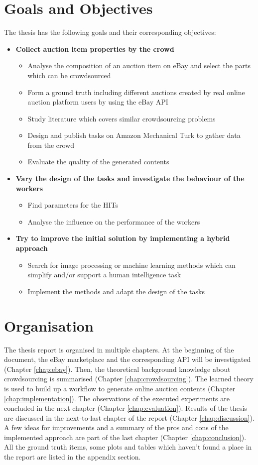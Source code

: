 \documentclass[a4paper]{report}
\begin{document}
\section{Goals and Objectives}
The thesis has the following goals and their corresponding objectives:
\begin{itemize}
	\item \textbf{Collect auction item properties by the crowd}
	\begin{itemize}
		\item Analyse the composition of an auction item on eBay and select the parts which can be crowdsourced
		\item Form a ground truth including different auctions created by real online auction platform users by using the eBay API
		\item Study literature which covers similar crowdsourcing problems
		\item Design and publish tasks on Amazon Mechanical Turk to gather data from the crowd
		\item Evaluate the quality of the generated contents
	\end{itemize}
	\item \textbf{Vary the design of the tasks and investigate the behaviour of the workers}
	\begin{itemize}
		\item Find parameters for the HITs
		\item Analyse the influence on the performance of the workers
	\end{itemize}
	\item \textbf{Try to improve the initial solution by implementing a hybrid approach}
	\begin{itemize}
		\item Search for image processing or machine learning methods which can simplify and/or support a human intelligence task
		\item Implement the methods and adapt the design of the tasks
	\end{itemize}
\end{itemize}

\section{Organisation}
The thesis report is organised in multiple chapters. At the beginning of the document, the eBay marketplace and the corresponding API will be investigated (Chapter \ref{chap:ebay}). Then, the theoretical background knowledge about crowdsourcing is summarised (Chapter \ref{chap:crowdsourcing}). The learned theory is used to build up a workflow to generate online auction contents (Chapter \ref{chap:implementation}). The observations of the executed experiments are concluded in the next chapter (Chapter \ref{chap:evaluation}). Results of the thesis are discussed in the next-to-last chapter of the report (Chapter \ref{chap:discussion}). A few ideas for improvements and a summary of the pros and cons of the implemented approach are part of the last chapter (Chapter \ref{chap:conclusion}). All the ground truth items, some plots and tables which haven't found a place in the report are listed in the appendix section.
\end{document}
